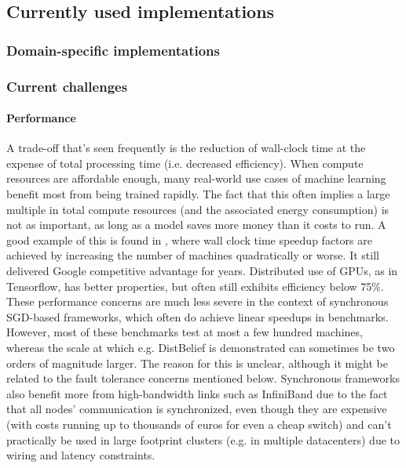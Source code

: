 \subsection{Currently used implementations}

\subsubsection{Domain-specific implementations}

\subsubsection{Current challenges}
\paragraph{Performance}

A trade-off that’s seen frequently is the reduction of wall-clock time at the expense of total processing time (i.e. decreased efficiency). When compute resources are affordable enough, many real-world use cases of machine learning benefit most from being trained rapidly. The fact that this often implies a large multiple in total compute resources (and the associated energy consumption) is not as important, as long as a model saves more money than it costs to run.  A good example of this is found in \citet{DistBelief2012}, where wall clock time speedup factors are achieved by increasing the number of machines quadratically or worse. It still delivered Google competitive advantage for years. Distributed use of GPUs, as in Tensorflow, has better properties, but often still exhibits efficiency below 75\%.
These performance concerns are much less severe in the context of synchronous SGD-based frameworks, which often do achieve linear speedups in benchmarks. However, most of these benchmarks test at most a few hundred machines, whereas the scale at which e.g. DistBelief is demonstrated can sometimes be two orders of magnitude larger. The reason for this is unclear, although it might be related to the fault tolerance concerns mentioned below. Synchronous frameworks also benefit more from high-bandwidth links such as InfiniBand due to the fact that all nodes' communication is synchronized, even though they are expensive (with costs running up to thousands of euros for even a cheap switch) and can't practically be used in large footprint clusters (e.g. in multiple datacenters) due to wiring and latency constraints.

